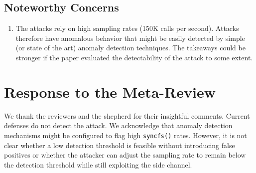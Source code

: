 \subsection{Noteworthy Concerns} %
\begin{enumerate} %
\item  The attacks rely on high sampling rates (150K calls per second). Attacks therefore have anomalous behavior that might be easily detected by simple (or state of the art) anomaly detection techniques. The takeaways could be stronger if the paper evaluated the detectability of the attack to some extent.
\end{enumerate}

\section{Response to the Meta-Review} %

We thank the reviewers and the shepherd for their insightful comments. Current defenses do not detect the attack.  We acknowledge that anomaly detection mechanisms might be configured to flag high \texttt{syncfs()} rates. However, it is not clear whether a low detection threshold is feasible without introducing false positives or whether the attacker can adjust the sampling rate to remain below the detection threshold while still exploiting the side channel. 